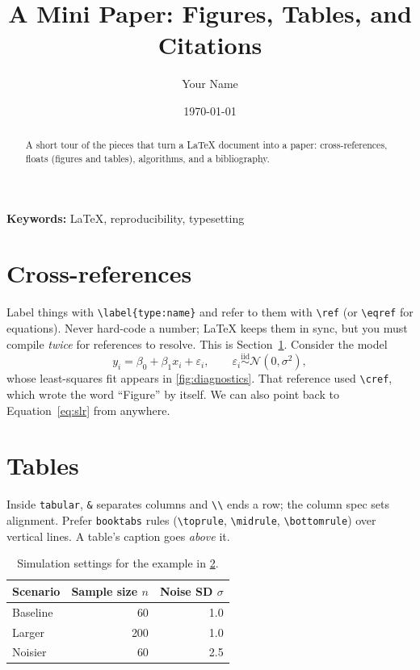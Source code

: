 \documentclass[11pt]{article}
\title{A Mini Paper: Figures, Tables, and Citations}
\author{Your Name}
\date{\today}
\begin{document}
\maketitle

\begin{abstract}
A short tour of the pieces that turn a LaTeX document into a paper:
cross-references, floats (figures and tables), algorithms, and a bibliography.
\end{abstract}

\noindent \textbf{Keywords:} LaTeX, reproducibility, typesetting

\section{Cross-references}\label{sec:refs}

Label things with \verb|\label{type:name}| and refer to them with \verb|\ref|
(or \verb|\eqref| for equations).
Never hard-code a number; LaTeX keeps them in sync, but you must compile
\emph{twice} for references to resolve.
This is Section~\ref{sec:refs}.
Consider the model
\begin{equation}\label{eq:slr}
  y_i = \beta_0 + \beta_1 x_i + \varepsilon_i,
  \qquad \varepsilon_i \overset{\text{iid}}{\sim} \mathcal{N}(0, \sigma^2),
\end{equation}
whose least-squares fit appears in \cref{fig:diagnostics}.
That reference used \verb|\cref|, which wrote the word ``Figure'' by itself.
We can also point back to Equation~\eqref{eq:slr} from anywhere.

\section{Tables}\label{sec:tables}

Inside \texttt{tabular}, \texttt{\&} separates columns and \verb|\\| ends a row;
the column spec sets alignment.
Prefer \texttt{booktabs} rules (\verb|\toprule|, \verb|\midrule|,
\verb|\bottomrule|) over vertical lines.
A table's caption goes \emph{above} it.

\begin{table}[ht!]
  \centering
  \caption{Simulation settings for the example in \cref{sec:tables}.}
  \label{tab:settings}
  \begin{tabular}{lrr}
    \toprule
    Scenario & Sample size $n$ & Noise SD $\sigma$ \\
    \midrule
    Baseline & 60  & 1.0 \\
    Larger   & 200 & 1.0 \\
    Noisier  & 60  & 2.5 \\
    \bottomrule
  \end{tabular}
\end{table}
\end{document}
